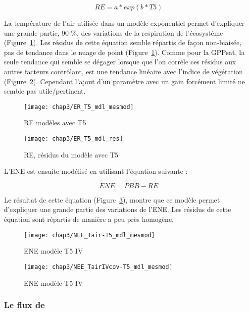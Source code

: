\begin{equation} \label{eq:RE_T5}
RE = a*exp(b*T5)
\end{equation}

La température de l'air utilisée dans un modèle exponentiel permet d'expliquer une grande partie, 90 \%, des variations de la respiration de l'écosystème (Figure~\ref{fig:ER_T5_mdl}).
Les résidus de cette équation semble répartis de façon non-biaisée, pas de tendance dans le nuage de point (Figure~\ref{fig:ER_T5_mdl}). 
Comme pour la GPPsat, la seule tendance qui semble se dégager lorsque que l'on corrèle ces résidus aux autres facteurs contrôlant, est une tendance linéaire avec l'indice de végétation (Figure~\ref{fig:ER_T5_res}).
Cependant l'ajout d'un paramètre avec un gain forcément limité ne semble pas utile/pertinent.

\begin{figure}
\centering
\texttt{[image: chap3/ER\_T5\_mdl\_mesmod]}
\caption{RE modèles avec T5}
\label{fig:ER_T5_mdl}
\end{figure}

\begin{figure}
\centering
\texttt{[image: chap3/ER\_T5\_mdl\_res]}
\caption{RE, résidus du modèle avec T5}
\label{fig:ER_T5_res}
\end{figure}


L'ENE est ensuite modélisé en utilisant l'équation suivante :

\begin{equation}
ENE = PBB-RE
\end{equation}

Le résultat de cette équation (Figure~\ref{fig:ENE_T5_mdl}), montre que ce modèle permet d'expliquer une grande partie des variations de l'ENE.
Les résidus de cette équation sont répartis de manière a peu près homogène.

\begin{figure}
\centering
\texttt{[image: chap3/NEE\_Tair-T5\_mdl\_mesmod]}
\caption{ENE modèle T5 IV}
\label{fig:ENE_T5_mdl}
\end{figure}

\begin{figure}
\centering
\texttt{[image: chap3/NEE\_TairIVcov-T5\_mdl\_mesmod]}
\caption{ENE modèle T5 IV}
\label{fig:ENE_T5IV_mdl}
\end{figure}

\subsubsection{Le flux de \chh}

